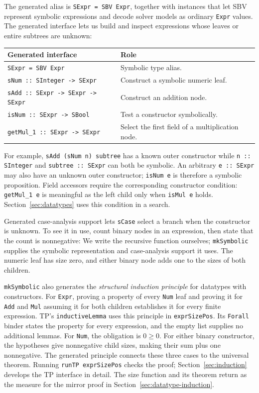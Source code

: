 \documentclass[review]{jfp-epi}
\newcommand{\code}[1]{\texttt{#1}}
\begin{document}
The generated alias is \code{SExpr = SBV Expr}, together with instances that let
SBV represent symbolic expressions and decode solver models as ordinary
\code{Expr} values. The generated interface lets us build and inspect expressions
whose leaves or entire subtrees are unknown:
\begin{center}
\begin{tabularx}{\linewidth}{@{}lX@{}}
\toprule
Generated interface & Role \\
\midrule
\code{SExpr = SBV Expr} & Symbolic type alias. \\
\code{sNum :: SInteger -> SExpr} & Construct a symbolic numeric leaf. \\
\code{sAdd :: SExpr -> SExpr -> SExpr} & Construct an addition node. \\
\code{isNum :: SExpr -> SBool} & Test a constructor symbolically. \\
\code{getMul\_1 :: SExpr -> SExpr} & Select the first field of a multiplication node. \\
\bottomrule
\end{tabularx}
\end{center}
For example, \code{sAdd (sNum n) subtree} has a known outer constructor while
\code{n :: SInteger} and \code{subtree :: SExpr} can both be symbolic.
An arbitrary \code{e :: SExpr} may also have an unknown outer constructor;
\code{isNum e} is therefore a symbolic proposition. Field accessors require
the corresponding constructor condition: \code{getMul\_1 e} is meaningful as
the left child only when \code{isMul e} holds. Section~\ref{sec:datatypes}
uses this condition in a search.

Generated case-analysis support lets \code{sCase} select a branch when the
constructor is unknown. To see it in use, count binary nodes in an expression,
then state that the count is nonnegative:
We write the recursive function ourselves; \code{mkSymbolic} supplies the
symbolic representation and case-analysis support it uses. The numeric leaf
has size zero, and either binary node adds one to the sizes of both children.

\code{mkSymbolic} also generates the \emph{structural induction principle} for
datatypes with constructors. For \code{Expr}, proving a property of every
\code{Num} leaf and proving it for \code{Add} and \code{Mul} assuming it for
both children establishes it for every finite expression. TP's
\code{inductiveLemma} uses this principle in \code{exprSizePos}. Its
\code{Forall} binder states the property for every expression, and the empty
list supplies no additional lemmas. For \code{Num}, the obligation is
$0\geq 0$. For either binary constructor, the hypotheses give nonnegative
child sizes, making their sum plus one nonnegative. The generated principle
connects these three cases to the universal theorem. Running
\code{runTP exprSizePos} checks the proof; Section~\ref{sec:induction} develops
the TP interface in detail. The size function and its theorem return as the
measure for the mirror proof in Section~\ref{sec:datatype-induction}.
\end{document}

